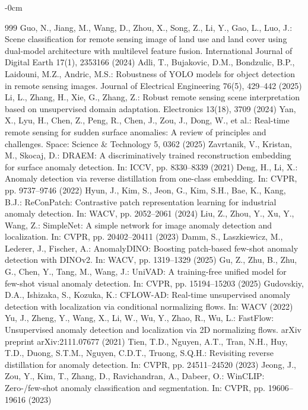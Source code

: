 \documentclass[remotesensing,article,submit,pdftex,moreauthors]{Definitions/mdpi}
\begin{document}
\begin{adjustwidth}{-\extralength}{0cm}
\begin{thebibliography}{999}
Guo, N., Jiang, M., Wang, D., Zhou, X., Song, Z., Li, Y., Gao, L., Luo, J.: Scene classification for remote sensing image of land use and land cover using dual-model architecture with multilevel feature fusion. International Journal of Digital Earth 17(1), 2353166 (2024)
Adli, T., Bujakovic, D.M., Bondzulic, B.P., Laidouni, M.Z., Andric, M.S.: Robustness of YOLO models for object detection in remote sensing images. Journal of Electrical Engineering 76(5), 429--442 (2025)
Li, L., Zhang, H., Xie, G., Zhang, Z.: Robust remote sensing scene interpretation based on unsupervised domain adaptation. Electronics 13(18), 3709 (2024)
Yan, X., Lyu, H., Chen, Z., Peng, R., Chen, J., Zou, J., Dong, W., et al.: Real-time remote sensing for sudden surface anomalies: A review of principles and challenges. Space: Science \& Technology 5, 0362 (2025)
Zavrtanik, V., Kristan, M., Skocaj, D.: DRAEM: A discriminatively trained reconstruction embedding for surface anomaly detection. In: ICCV, pp. 8330--8339 (2021)
Deng, H., Li, X.: Anomaly detection via reverse distillation from one-class embedding. In: CVPR, pp. 9737--9746 (2022)
Hyun, J., Kim, S., Jeon, G., Kim, S.H., Bae, K., Kang, B.J.: ReConPatch: Contrastive patch representation learning for industrial anomaly detection. In: WACV, pp. 2052--2061 (2024)
Liu, Z., Zhou, Y., Xu, Y., Wang, Z.: SimpleNet: A simple network for image anomaly detection and localization. In: CVPR, pp. 20402--20411 (2023)
Damm, S., Laszkiewicz, M., Lederer, J., Fischer, A.: AnomalyDINO: Boosting patch-based few-shot anomaly detection with DINOv2. In: WACV, pp. 1319--1329 (2025)
Gu, Z., Zhu, B., Zhu, G., Chen, Y., Tang, M., Wang, J.: UniVAD: A training-free unified model for few-shot visual anomaly detection. In: CVPR, pp. 15194--15203 (2025)
Gudovskiy, D.A., Ishizaka, S., Kozuka, K.: CFLOW-AD: Real-time unsupervised anomaly detection with localization via conditional normalizing flows. In: WACV (2022)
Yu, J., Zheng, Y., Wang, X., Li, W., Wu, Y., Zhao, R., Wu, L.: FastFlow: Unsupervised anomaly detection and localization via 2D normalizing flows. arXiv preprint arXiv:2111.07677 (2021)
Tien, T.D., Nguyen, A.T., Tran, N.H., Huy, T.D., Duong, S.T.M., Nguyen, C.D.T., Truong, S.Q.H.: Revisiting reverse distillation for anomaly detection. In: CVPR, pp. 24511--24520 (2023)
Jeong, J., Zou, Y., Kim, T., Zhang, D., Ravichandran, A., Dabeer, O.: WinCLIP: Zero-/few-shot anomaly classification and segmentation. In: CVPR, pp. 19606--19616 (2023)

\end{thebibliography}
\end{adjustwidth}
\end{document}
